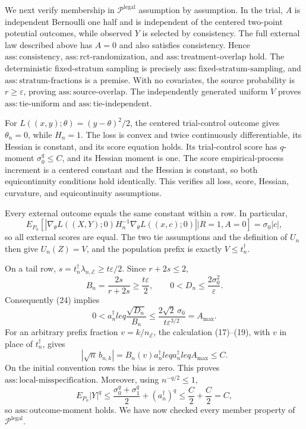 We next verify membership in \(\mathcal P^{\mathrm{legal}}\) assumption by assumption.  In the trial, \(A\) is independent Bernoulli one half and is independent of the centered two-point potential outcomes, while observed \(Y\) is selected by consistency.  The full external law described above has \(A=0\) and also satisfies consistency.  Hence \(\mathrm{ass:consistency}\), \(\mathrm{ass:rct\text{-}randomization}\), and \(\mathrm{ass:treatment\text{-}overlap}\) hold.  The deterministic fixed-stratum sampling is precisely \(\mathrm{ass:fixed\text{-}stratum\text{-}sampling}\), and \(\mathrm{ass:stratum\text{-}fractions}\) is a premise.  With no covariates, the source probability is \(r\geq\varepsilon\), proving \(\mathrm{ass:source\text{-}overlap}\).  The independently generated uniform \(V\) proves \(\mathrm{ass:tie\text{-}uniform}\) and \(\mathrm{ass:tie\text{-}independent}\).

For \(L((x,y);\theta)=(y-\theta)^2/2\), the centered trial-control outcome gives \(\theta_n=0\), while \(H_n=1\).  The loss is convex and twice continuously differentiable, its Hessian is constant, and its score equation holds.  Its trial-control score has \(q\)-moment \(\sigma_0^q\leq C\), and its Hessian moment is one.  The score empirical-process increment is a centered constant and the Hessian is constant, so both equicontinuity conditions hold identically.  This verifies all loss, score, Hessian, curvature, and equicontinuity assumptions.

Every external outcome equals the same constant within a row.  In particular,
\[
 E_{P_n}\!\left[
 \left|\nabla_\theta L((X,Y);0)H_n^{-1}
 \nabla_\theta L((x,c);0)\right|
 \mathrel{\big|}R=1,A=0\right]
 =\sigma_0|c|,
\]
so all external scores are equal.  The two tie assumptions and the definition of \(U_n\) then give \(U_n(Z)=V\), and the population prefix is exactly \(V\leq t_n^{\dagger}\).

On a tail row, \(s=t_n^{\dagger}\lambda_{n,\mathcal E}\geq t\varepsilon/2\).  Since \(r+2s\leq2\),
\[
 B_n=\frac{2s}{r+2s}\geq\frac{t\varepsilon}{2},
 \qquad
 0<D_n\leq\frac{2\sigma_0^2}{\varepsilon}.
\]
Consequently (24) implies
\[
 0<a_n^{\dagger}leq\frac{\sqrt{D_n}}{B_n}
 \leq\frac{2\sqrt2\,\sigma_0}{t\varepsilon^{3/2}}
 =A_{\max}.
\tag{26}
\]
For an arbitrary prefix fraction \(v=k/n_{\mathcal E}\), the calculation (17)--(19), with \(v\) in place of \(t_n^{\dagger}\), gives
\[
 |\sqrt n\,b_{n,k}|=B_n(v)a_n^{\dagger}leq a_n^{\dagger}leq A_{\max}\leq C.
\]
On the initial convention rows the bias is zero.  This proves \(\mathrm{ass:local\text{-}misspecification}\).  Moreover, using \(n^{-q/2}\leq1\),
\[
 E_{P_n}|Y|^q
 \leq \frac{\sigma_0^q+\sigma_1^q}{2}
      +(a_n^{\dagger})^q
 \leq \frac C2+\frac C2=C,
\]
so \(\mathrm{ass:outcome\text{-}moment}\) holds.  We have now checked every member property of \(\mathcal P^{\mathrm{legal}}\).

